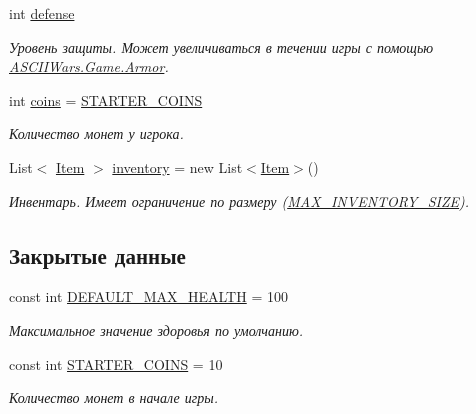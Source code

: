 \begin{DoxyCompactItemize}
\hypertarget{class_a_s_c_i_i_wars_1_1_game_1_1_player_a1dc39c7d8054c42dcb7af70e78b3be02}{}\label{class_a_s_c_i_i_wars_1_1_game_1_1_player_a1dc39c7d8054c42dcb7af70e78b3be02} 
int \hyperlink{class_a_s_c_i_i_wars_1_1_game_1_1_player_a1dc39c7d8054c42dcb7af70e78b3be02}{defense}
\begin{DoxyCompactList}\small\item\em Уровень защиты. Может увеличиваться в течении игры с помощью \hyperlink{class_a_s_c_i_i_wars_1_1_game_1_1_armor}{A\+S\+C\+I\+I\+Wars.\+Game.\+Armor}. \end{DoxyCompactList}\item 
\hypertarget{class_a_s_c_i_i_wars_1_1_game_1_1_player_a5abede19c5428143df924357ad475691}{}\label{class_a_s_c_i_i_wars_1_1_game_1_1_player_a5abede19c5428143df924357ad475691} 
int \hyperlink{class_a_s_c_i_i_wars_1_1_game_1_1_player_a5abede19c5428143df924357ad475691}{coins} = \hyperlink{class_a_s_c_i_i_wars_1_1_game_1_1_player_af33b6af0d723918290a4a38aa4a6fb66}{S\+T\+A\+R\+T\+E\+R\+\_\+\+C\+O\+I\+NS}
\begin{DoxyCompactList}\small\item\em Количество монет у игрока. \end{DoxyCompactList}\item 
\hypertarget{class_a_s_c_i_i_wars_1_1_game_1_1_player_a04acfaa196162f89bfae7aee5ec45480}{}\label{class_a_s_c_i_i_wars_1_1_game_1_1_player_a04acfaa196162f89bfae7aee5ec45480} 
List$<$ \hyperlink{class_a_s_c_i_i_wars_1_1_game_1_1_item}{Item} $>$ \hyperlink{class_a_s_c_i_i_wars_1_1_game_1_1_player_a04acfaa196162f89bfae7aee5ec45480}{inventory} = new List$<$\hyperlink{class_a_s_c_i_i_wars_1_1_game_1_1_item}{Item}$>$()
\begin{DoxyCompactList}\small\item\em Инвентарь. Имеет ограничение по размеру (\hyperlink{class_a_s_c_i_i_wars_1_1_game_1_1_player_a1cc8a05398a717bcf8c5a0ebd2ea0747}{M\+A\+X\+\_\+\+I\+N\+V\+E\+N\+T\+O\+R\+Y\+\_\+\+S\+I\+ZE}). \end{DoxyCompactList}\end{DoxyCompactItemize}
\subsection*{Закрытые данные}
\begin{DoxyCompactItemize}
\item 
const int \hyperlink{class_a_s_c_i_i_wars_1_1_game_1_1_player_ab5921985db319187e317563c15ef48dc}{D\+E\+F\+A\+U\+L\+T\+\_\+\+M\+A\+X\+\_\+\+H\+E\+A\+L\+TH} = 100
\begin{DoxyCompactList}\small\item\em Максимальное значение здоровья по умолчанию. \end{DoxyCompactList}\item 
const int \hyperlink{class_a_s_c_i_i_wars_1_1_game_1_1_player_af33b6af0d723918290a4a38aa4a6fb66}{S\+T\+A\+R\+T\+E\+R\+\_\+\+C\+O\+I\+NS} = 10
\begin{DoxyCompactList}\small\item\em Количество монет в начале игры. \end{DoxyCompactList}\end{DoxyCompactItemize}


